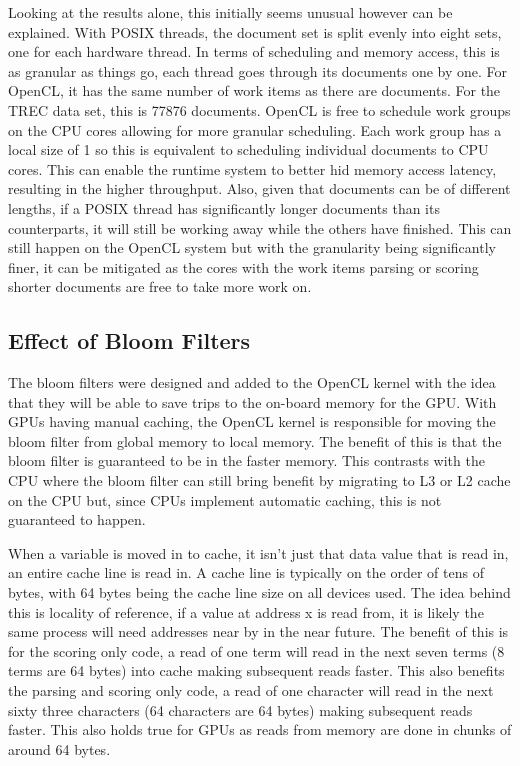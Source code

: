 Looking at the results alone, this initially seems unusual however can be
explained. With POSIX threads, the document set is split evenly into eight sets,
one for each hardware thread. In terms of scheduling and memory access, this is
as granular as things go, each thread goes through its documents one by one. For
OpenCL, it has the same number of work items as there are documents. For the
TREC data set, this is 77876 documents. OpenCL is free to schedule work groups
on the CPU cores allowing for more granular scheduling. Each work group has a
local size of 1 so this is equivalent to scheduling individual documents to CPU
cores. This can enable the runtime system to better hid memory access latency,
resulting in the higher throughput. Also, given that documents can be of
different lengths, if a POSIX thread has significantly longer documents than its
counterparts, it will still be working away while the others have finished. This
can still happen on the OpenCL system but with the granularity being
significantly finer, it can be mitigated as the cores with the work items
parsing or scoring shorter documents are free to take more work on.

\subsection{Effect of Bloom Filters}

The bloom filters were designed and added to the OpenCL kernel with the idea
that they will be able to save trips to the on-board memory for the GPU. With
GPUs having manual caching, the OpenCL kernel is responsible for moving the
bloom filter from global memory to local memory. The benefit of this is that the
bloom filter is guaranteed to be in the faster memory. This contrasts with the
CPU where the bloom filter can still bring benefit by migrating to L3 or L2
cache on the CPU but, since CPUs implement automatic caching, this is not
guaranteed to happen.

When a variable is moved in to cache, it isn't just that data value that is read
in, an entire cache line is read in. A cache line is typically on the order of
tens of bytes, with 64 bytes being the cache line size on all devices used. The
idea behind this is locality of reference, if a value at address x is read from,
it is likely the same process will need addresses near by in the near future.
The benefit of this is for the scoring only code, a read of one term will read
in the next seven terms (8 terms are 64 bytes) into cache making subsequent
reads faster. This also benefits the parsing and scoring only code, a read of
one character will read in the next sixty three characters (64 characters are 64
bytes) making subsequent reads faster. This also holds true for GPUs as reads
from memory are done in chunks of around 64 bytes.

